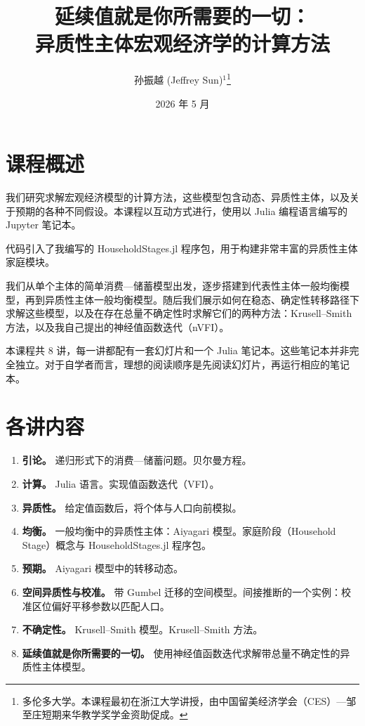 \documentclass[11pt]{article}
\title{延续值就是你所需要的一切：\\
异质性主体宏观经济学的计算方法}
\author{孙振越 (Jeffrey Sun)$^1$\footnote{多伦多大学。本课程最初在浙江大学讲授，由中国留美经济学会（CES）—邹至庄短期来华教学奖学金资助促成。}}
\date{}
\begin{document}
\date{2026 年 5 月}
\maketitle

\vspace*{-1em}
\section*{课程概述}

我们研究求解宏观经济模型的计算方法，这些模型包含动态、异质性主体，以及关于预期的各种不同假设。本课程以互动方式进行，使用以 Julia 编程语言编写的 Jupyter 笔记本。

代码引入了我编写的 HouseholdStages.jl 程序包，用于构建非常丰富的异质性主体家庭模块。

我们从单个主体的简单消费—储蓄模型出发，逐步搭建到代表性主体一般均衡模型，再到异质性主体一般均衡模型。随后我们展示如何在稳态、确定性转移路径下求解这些模型，以及在存在总量不确定性时求解它们的两种方法：Krusell--Smith 方法，以及我自己提出的神经值函数迭代（nVFI）。

本课程共 8 讲，每一讲都配有一套幻灯片和一个 Julia 笔记本。这些笔记本并非完全独立。对于自学者而言，理想的阅读顺序是先阅读幻灯片，再运行相应的笔记本。

\section*{各讲内容}

\begin{enumerate}
  \item \textbf{引论。} 递归形式下的消费—储蓄问题。贝尔曼方程。

  \item \textbf{计算。} Julia 语言。实现值函数迭代（VFI）。

  \item \textbf{异质性。} 给定值函数后，将个体与人口向前模拟。

  \item \textbf{均衡。} 一般均衡中的异质性主体：Aiyagari 模型。家庭阶段（Household Stage）概念与 HouseholdStages.jl 程序包。

  \item \textbf{预期。} Aiyagari 模型中的转移动态。

  \item \textbf{空间异质性与校准。} 带 Gumbel 迁移的空间模型。间接推断的一个实例：校准区位偏好平移参数以匹配人口。

  \item \textbf{不确定性。} Krusell--Smith 模型。Krusell--Smith 方法。

  \item \textbf{延续值就是你所需要的一切。} 使用神经值函数迭代求解带总量不确定性的异质性主体模型。
\end{enumerate}
\end{document}
